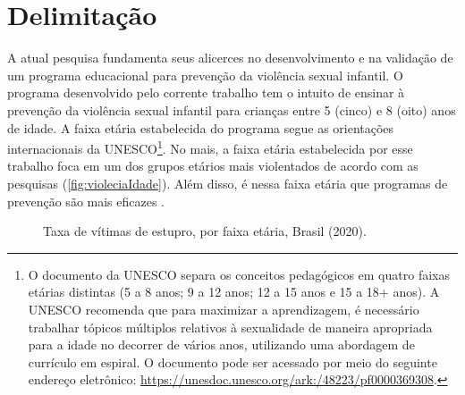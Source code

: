 
\section{Delimitação}\label{sec:Escopo}

A atual pesquisa fundamenta seus alicerces no desenvolvimento e na validação de um programa educacional para prevenção da violência sexual infantil. O programa desenvolvido pelo corrente trabalho tem o intuito de ensinar à prevenção da violência sexual infantil para crianças entre 5 (cinco) e 8 (oito) anos de idade. A faixa etária estabelecida do programa segue as orientações internacionais da \ac{UNESCO}\footnote{O documento da UNESCO separa os conceitos pedagógicos em quatro faixas etárias distintas (5 a 8 anos; 9 a 12 anos; 12 a 15 anos e 15 a 18+ anos). A \ac{UNESCO} recomenda que para maximizar a aprendizagem, é necessário trabalhar tópicos múltiplos relativos à sexualidade de maneira apropriada para a idade no decorrer de vários anos, utilizando uma abordagem de currículo em espiral. O documento pode ser acessado por meio do seguinte endereço eletrônico: \url{https://unesdoc.unesco.org/ark:/48223/pf0000369308}.}. No mais, a faixa etária estabelecida por esse trabalho foca em um dos grupos etários mais violentados de acordo com as pesquisas (\autoref{fig:violeciaIdade}). Além disso, é nessa faixa etária que programas de prevenção são mais eficazes \cite{davis2000child}.

\begin{figure}[htb]
	\caption{Taxa de vítimas de estupro, por faixa etária, Brasil (2020).}\label{fig:violeciaIdade}
	\vspace{-0.5cm}
\end{figure}



